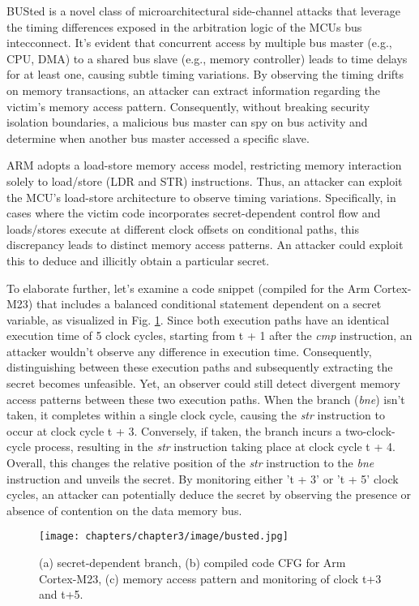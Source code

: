 BUSted \cite{busted} is a novel class of microarchitectural side-channel attacks that leverage the timing differences exposed in the arbitration logic of the MCUs bus intecconnect. It's evident that concurrent access by multiple bus master (e.g., CPU, DMA) to a shared bus slave (e.g., memory controller) leads to time delays for at least one, causing subtle timing variations. By observing the timing drifts on memory transactions, an attacker can extract information regarding the victim’s memory access pattern. Consequently, without breaking security isolation boundaries, a malicious bus master can spy on bus activity and determine when another bus master accessed a specific slave.

ARM adopts a load-store memory access model, restricting memory interaction solely to load/store (LDR and STR) instructions. Thus, an attacker can exploit the MCU's load-store architecture to observe timing variations. Specifically, in cases where the victim code incorporates secret-dependent control flow and loads/stores execute at different clock offsets on conditional paths, this discrepancy leads to distinct memory access patterns. An attacker could exploit this to deduce and illicitly obtain a particular secret.

To elaborate further, let's examine a code snippet (compiled for the Arm Cortex-M23) that includes a balanced conditional statement dependent on a secret variable, as visualized in Fig. \ref{fig:busted}. Since both execution paths have an identical execution time of 5 clock cycles, starting from t + 1 after the \textit{cmp} instruction, an attacker wouldn't observe any difference in execution time. Consequently, distinguishing between these execution paths and subsequently extracting the secret becomes unfeasible. Yet, an observer could still detect divergent memory access patterns between these two execution paths. When the branch (\textit{bne}) isn't taken, it completes within a single clock cycle, causing the \textit{str} instruction to occur at clock cycle t + 3. Conversely, if taken, the branch incurs a two-clock-cycle process, resulting in the \textit{str} instruction taking place at clock cycle t + 4. Overall, this changes the relative position of the \textit{str} instruction to the \textit{bne} instruction and unveils the secret. By monitoring either 't + 3' or 't + 5' clock cycles, an attacker can potentially deduce the secret by observing the presence or absence of contention on the data memory bus.

\begin{figure}
  \centering
  \medskip
  \texttt{[image: chapters/chapter3/image/busted.jpg]}
  \caption[Short caption for Table of Figures]{(a) secret-dependent branch, (b) compiled code CFG for Arm Cortex-M23, (c) memory access pattern and monitoring of clock t+3 and t+5.}
  \label{fig:busted}
\end{figure}

